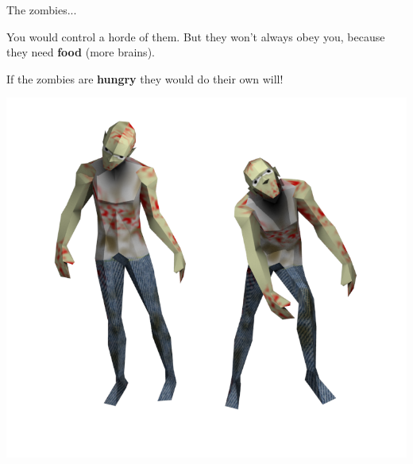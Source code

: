 \documentclass[10pt]{beamer}
\begin{document}
	\begin{frame}{The zombies...}

	   \vspace{1cm}
	   You would control a horde of them. But they won't always obey you, because they need \textbf{food} (more brains).
	   \newline
	    
	   If the zombies are \textbf{hungry} they would do their own will!

	  \begin{center}
	  \includegraphics[scale=0.7]{zombies.png}
	  \end{center}
	\end{frame}
\end{document}
